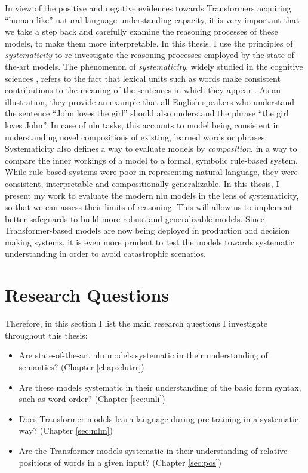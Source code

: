 \documentclass[letterpaper, 12pt]{report}
\begin{document}
In view of the positive and negative evidences towards Transformers acquiring ``human-like'' natural language understanding capacity, it is very important that we take a step back and carefully examine the reasoning processes of these models, to make them more interpretable. In this thesis, I use the principles of \textit{systematicity} to re-investigate the reasoning processes employed by the state-of-the-art models.
The phenomenon of \textit{systematicity}, widely studied in the cognitive sciences \citep{gentner1986systematicity}, refers to the fact that lexical units such as words make consistent contributions to the meaning of the sentences in which they appear \citep{fodor1988connectionism}. As an illustration, they provide an example that all English speakers who understand the sentence ``John loves the girl'' should also understand the phrase ``the girl loves John''. In case of \acrshort{nlu} tasks, this accounts to model being consistent in understanding novel compositions of existing, learned words or phrases. Systematicity also defines a way to evaluate models by \textit{composition}, in a way to compare the inner workings of a model to a formal, symbolic rule-based system. While rule-based systems were poor in representing natural language, they were consistent, interpretable and compositionally generalizable. In this thesis, I present my work to evaluate the modern \acrshort{nlu} models in the lens of systematicity, so that we can assess their limits of reasoning. This will allow us to implement better safeguards to build more robust and generalizable models. Since Transformer-based models are now being deployed in production and decision making systems, it is even more prudent to test the models towards systematic understanding in order to avoid catastrophic scenarios.

\section{Research Questions}

Therefore, in this section I list the main research questions I investigate throughout this thesis:

\begin{itemize}
  \item Are state-of-the-art \acrshort{nlu} models systematic in their understanding of semantics? (Chapter \autoref{chap:clutrr})
  \item Are these models systematic in their understanding of the basic form syntax, such as word order? (Chapter \autoref{sec:unli})
  \item Does Transformer models learn language during pre-training in a systematic way? (Chapter \autoref{sec:mlm})
  \item Are the Transformer models systematic in their understanding of relative positions of words in a given input? (Chapter \autoref{sec:pos})
\end{itemize}
\end{document}
